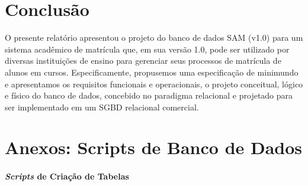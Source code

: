 \documentclass{article}
\begin{document}
\clearpage
\section{Conclus\~ao}
O presente relat\'orio apresentou o projeto do banco de dados SAM (v1.0) para um sistema acad\^emico de matr\'icula que, em sua vers\~ao 1.0, pode ser utilizado por diversas institui\c{c}\~oes de ensino para gerenciar seus processos de matr\'icula de alunos em cursos.
Especificamente, propusemos uma especifica\c{c}\~ao de minimundo e apresentamos os requisitos funcionais e operacionais, o projeto conceitual, l\'ogico e f\'isico do banco de dados, concebido no paradigma relacional e projetado para ser implementado em um SGBD relacional comercial.

\clearpage
\section{Anexos: Scripts de Banco de Dados}
\label{sec:anexos}

%
%


\paragraph{\textit{Scripts} de Cria\c{c}\~ao de Tabelas}
\end{document}
